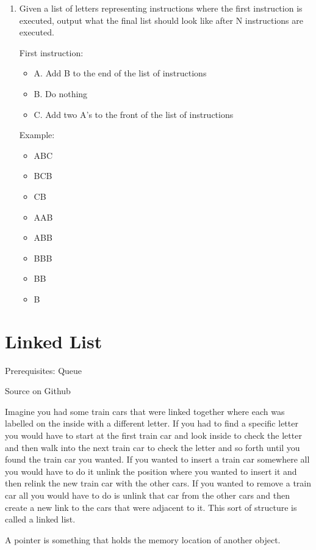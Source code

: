 \documentclass[11pt,oneside]{book}
\begin{document}
\begin{enumerate}
\item Given a list of letters representing instructions where the first instruction is executed, output what the final list should look like after N instructions are executed.

First instruction:

\begin{itemize}
\item A. Add B to the end of the list of instructions
\item B. Do nothing
\item C. Add two A's to the front of the list of instructions
\end{itemize}

Example:

\begin{itemize}
\item ABC
\item BCB
\item CB
\item AAB
\item ABB
\item BBB
\item BB
\item B
\end{itemize}
\end{enumerate}
\section{Linked List}

Prerequisites: Queue

Source on Github

Imagine you had some train cars that were linked together where each was labelled on the inside with a different letter. If you had to find a specific letter you would have to start at the first train car and look inside to check the letter and then walk into the next train car to check the letter and so forth until you found the train car you wanted. If you wanted to insert a train car somewhere all you would have to do it unlink the position where you wanted to insert it and then relink the new train car with the other cars. If you wanted to remove a train car all you would have to do is unlink that car from the other cars and then create a new link to the cars that were adjacent to it. This sort of structure is called a linked list.

A pointer is something that holds the memory location of another object.
\end{document}
